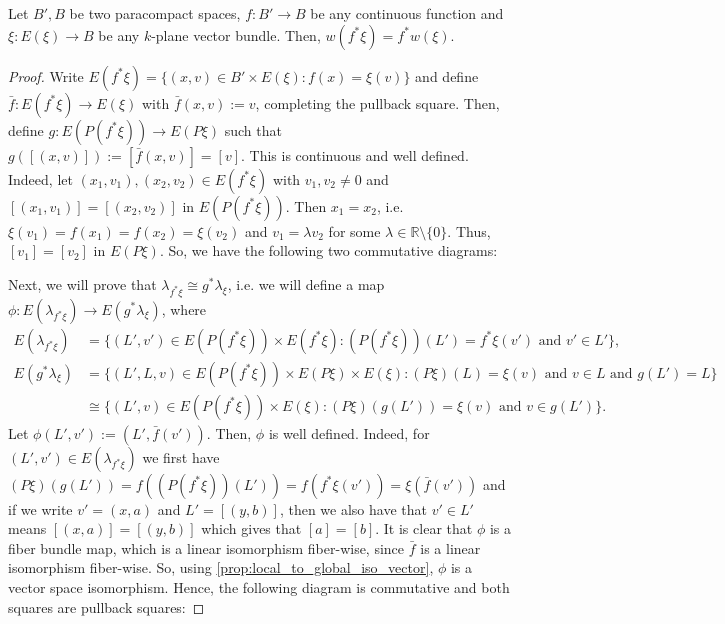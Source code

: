 \begin{proposition} Let $B',B$ be two paracompact spaces, $f:B'\to B$ be any continuous function and $\xi:E(\xi)\to B$ be any $k$-plane vector bundle. Then, $w(f^*\xi)=f^*w(\xi)$.
\end{proposition}
\begin{proof} Write $E(f^*\xi)=\big\{(x,v)\in B'\times E(\xi):f(x)=\xi(v)\big\}$ and define $\bar{f}:E(f^*\xi)\to E(\xi)$ with $\bar{f}(x,v):=v$, completing the pullback square. Then, define $g:E(P(f^*\xi))\to E(P\xi)$ such that $g([(x,v)]):=[\bar{f}(x,v)]=[v]$. This is continuous and well defined. Indeed, let $(x_1,v_1),(x_2,v_2)\in E(f^*\xi)$ with $v_1,v_2\neq 0$ and $[(x_1,v_1)]=[(x_2,v_2)]$ in $E(P(f^*\xi))$. Then $x_1=x_2$, i.e. $\xi(v_1)=f(x_1)=f(x_2)=\xi(v_2)$ and $v_1=\lambda v_2$ for some $\lambda\in\mathbb{R}\setminus\{0\}$. Thus, $[v_1]=[v_2]$ in $E(P\xi)$. So, we have the following two commutative diagrams:
\begin{center}
\end{center}
Next, we will prove that $\lambda_{f^*\xi}\cong g^*\lambda_{\xi}$, i.e. we will define a map $\phi:E(\lambda_{f^*\xi})\to E(g^*\lambda_{\xi})$, where
\begin{align*}
E(\lambda_{f^*\xi})&=\big\{(L',v')\in E(P(f^*\xi))\times E(f^*\xi):(P(f^*\xi))(L')=f^*\xi(v')\text{ and }v'\in L'\big\},\\[0.5em]
E(g^*\lambda_{\xi})&=\big\{(L',L,v)\in E(P(f^*\xi))\times E(P\xi)\times E(\xi):(P\xi)(L)=\xi(v)\text{ and }v\in L\text{ and }g(L')=L\big\}\\
&\cong\big\{(L',v)\in E(P(f^*\xi))\times E(\xi):(P\xi)(g(L'))=\xi(v)\text{ and }v\in g(L')\big\}.
\end{align*}
Let $\phi(L',v'):=(L',\bar{f}(v'))$. Then, $\phi$ is well defined. Indeed, for $(L',v')\in E(\lambda_{f^*\xi})$ we first have $(P\xi)(g(L'))=f((P(f^*\xi))(L'))=f(f^*\xi(v'))=\xi(\bar{f}(v'))$ and if we write $v'=(x,a)$ and $L'=[(y,b)]$, then we also have that $v'\in L'$ means $[(x,a)]=[(y,b)]$ which gives that $[a]=[b]$. It is clear that $\phi$ is a fiber bundle map, which is a linear isomorphism fiber-wise, since $\bar{f}$ is a linear isomorphism fiber-wise. So, using \ref{prop:local_to_global_iso_vector}, $\phi$ is a vector space isomorphism. Hence, the following diagram is commutative and both squares are pullback squares:

\end{proof}
